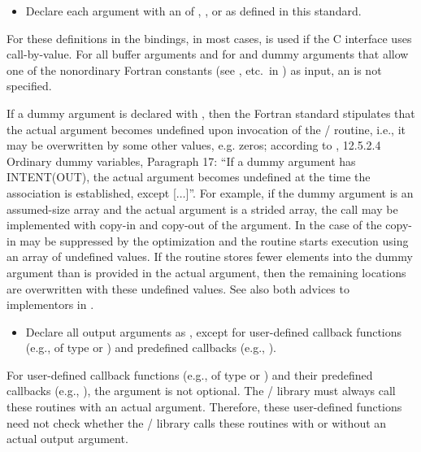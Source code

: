 \begin{itemize}
\item Declare each argument with an  of ,
, or  as defined in this standard.
\end{itemize}
\begin{rationale}
  For these definitions in the  bindings,
  in most cases,  is used if the C interface
  uses call-by-value. For all buffer arguments and for
   and  dummy arguments
  that allow one of the nonordinary Fortran constants
  (see , etc.\ in )
  as input, an  is not specified.
\end{rationale}
\begin{users}
If a dummy argument is declared with ,
then the Fortran standard stipulates that the actual argument
becomes undefined upon invocation of the \MPI/ routine,
i.e., it may be overwritten by some other values, e.g. zeros;
according to \cite{fortran2008}, 12.5.2.4 Ordinary dummy variables,
Paragraph 17:
``If a dummy argument has INTENT(OUT), the actual argument becomes undefined
at the time the association is established, except [$\ldots$]''.
For example, if the dummy argument is an
assumed-size array and the actual argument is a strided array,
the call may be implemented with copy-in and copy-out
of the argument. In the case of  the copy-in may
be suppressed by the optimization and the routine starts execution using
an array of undefined values. If the routine stores fewer
elements into the dummy argument than is provided in the actual
argument, then the remaining locations are overwritten with these
undefined values.
See also both advices to implementors in
.
\end{users}
\begin{itemize}
\item Declare all  output arguments as ,
except for user-defined callback functions
(e.g., of type  or\flushline
{})
and predefined callbacks (e.g., ).
\end{itemize}
\begin{rationale}
For user-defined callback functions
(e.g., of type  or ) and their
predefined callbacks (e.g., ),
the  argument is not optional.
The \MPI/ library must always call these routines with an actual  argument.
Therefore, these user-defined functions need not check whether the \MPI/
library calls these routines with or without an actual  output argument.
\end{rationale}

